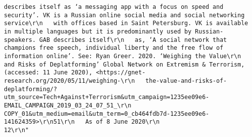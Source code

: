 \documentclass[
]{book}
\begin{document}
\begin{verbatim}
describes itself as ‘a messaging app with a focus on speed and security’. VK is a Russian online social media and social networking service\r\n   with offices based in Saint Petersburg. VK is available in multiple languages but it is predominantly used by Russian-speakers. GAB describes itself\r\n   as, ‘A social network that champions free speech, individual liberty and the free flow of information online’. See: Ryan Greer. 2020. ‘Weighing the Value\r\n   and Risks of Deplatforming’ Global Network on Extremism & Terrorism, (accessed: 11 June 2020), <https://gnet-research.org/2020/05/11/weighing-\r\n   the-value-and-risks-of-deplatforming/?utm_source=Tech+Against+Terrorism&utm_campaign=1235ee09e6-EMAIL_CAMPAIGN_2019_03_24_07_51_\r\n   COPY_01&utm_medium=email&utm_term=0_cb464fdb7d-1235ee09e6-141624359>\r\n51\r\n   As of 8 June 2020\r\n                                                                              12\r\n"                                                                                                                                                                                                                                                                                                                                                                                                                                                                                                                                                                                                                                                                                                                                                                                                                                                                                                                                                                                                                                                                                                                                                                                                                                                                                                                                                                                                                                                                                                                                                                                                                                                                                                                                                                                                                              

\end{verbatim}
\end{document}
